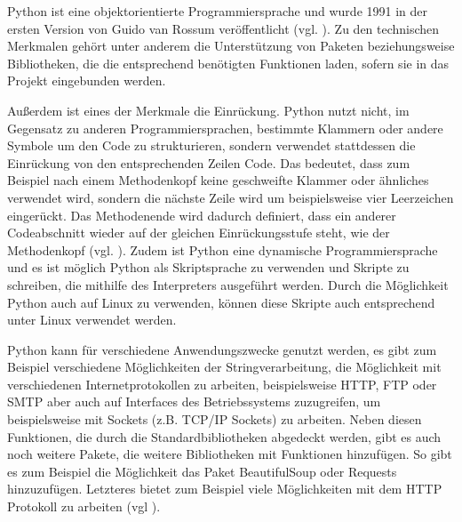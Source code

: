 Python ist eine objektorientierte Programmiersprache und wurde 1991 in der ersten Version von Guido van Rossum veröffentlicht (vgl. \cite{.05.03.2017}). Zu den technischen Merkmalen gehört unter anderem die Unterstützung von Paketen beziehungsweise Bibliotheken, die die entsprechend benötigten Funktionen laden, sofern sie in das Projekt eingebunden werden. 

Außerdem ist eines der Merkmale die Einrückung. Python nutzt nicht, im Gegensatz zu anderen Programmiersprachen, bestimmte Klammern oder andere Symbole um den Code zu strukturieren, sondern verwendet stattdessen die Einrückung von den entsprechenden Zeilen Code. Das bedeutet, dass zum Beispiel nach einem Methodenkopf keine geschweifte Klammer oder ähnliches verwendet wird, sondern die nächste Zeile wird um beispielsweise vier Leerzeichen eingerückt. Das Methodenende wird dadurch definiert, dass ein anderer Codeabschnitt wieder auf der gleichen Einrückungsstufe steht, wie der Methodenkopf (vgl. \cite{.19.08.2013}\cite{.10.03.2017b}). 
Zudem ist Python eine dynamische Programmiersprache und es ist möglich Python als Skriptsprache zu verwenden und Skripte zu schreiben, die mithilfe des Interpreters ausgeführt werden. Durch die Möglichkeit Python auch auf Linux zu verwenden, können diese Skripte auch entsprechend unter Linux verwendet werden.

Python kann für verschiedene Anwendungszwecke genutzt werden, es gibt zum Beispiel verschiedene Möglichkeiten der Stringverarbeitung, die Möglichkeit mit verschiedenen Internetprotokollen zu arbeiten, beispielsweise \ac{HTTP}, \ac{FTP} oder \ac{SMTP} aber auch auf Interfaces des Betriebssystems zuzugreifen, um beispielsweise mit Sockets (z.B. \ac{TCP}/\ac{IP} Sockets) zu arbeiten. Neben diesen Funktionen, die durch die Standardbibliotheken abgedeckt werden, gibt es auch noch weitere Pakete, die weitere Bibliotheken mit Funktionen hinzufügen. So gibt es zum Beispiel die Möglichkeit das Paket BeautifulSoup oder Requests hinzuzufügen. Letzteres bietet zum Beispiel viele Möglichkeiten mit dem \ac{HTTP} Protokoll zu arbeiten (vgl \cite{.m}\cite{.l}\cite{.05.03.2017}). 

